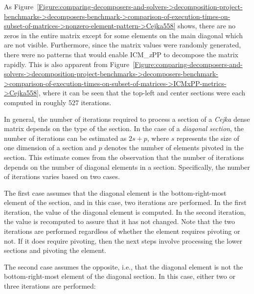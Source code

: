 As Figure~\ref{Figure:comparing-decomposers-and-solvers->decomposition-project-benchmarks->decomposers-benchmark->comparison-of-execution-times-on-subset-of-matrices->nonzero-element-pattern->Cejka558} shows, there are no zeros in the entire matrix except for some elements on the main diagonal which are not visible. Furthermore, since the matrix values were randomly generated, there were no patterns that would enable ICM\_\textit{x}PP to decompose the matrix rapidly. This is also apparent from Figure~\ref{Figure:comparing-decomposers-and-solvers->decomposition-project-benchmarks->decomposers-benchmark->comparison-of-execution-times-on-subset-of-matrices->ICMxPP-metrics->Cejka558}, where it can be seen that the top-left and center sections were each computed in roughly 527 iterations.

In general, the number of iterations required to process a section of a \textit{Cejka} dense matrix depends on the type of the section. In the case of a \textit{diagonal section}, the number of iterations can be estimated as $2s + p$, where $s$ represents the size of one dimension of a section and $p$ denotes the number of elements pivoted in the section. This estimate comes from the observation that the number of iterations depends on the number of diagonal elements in a section. Specifically, the number of iterations varies based on two cases.

The first case assumes that the diagonal element is the bottom-right-most element of the section, and in this case, two iterations are performed. In the first iteration, the value of the diagonal element is computed. In the second iteration, the value is recomputed to assure that it has not changed. Note that the two iterations are performed regardless of whether the element requires pivoting or not. If it does require pivoting, then the next steps involve processing the lower sections and pivoting the element.

The second case assumes the opposite, i.e., that the diagonal element is not the bottom-right-most element of the diagonal section. In this case, either two or three iterations are performed:

